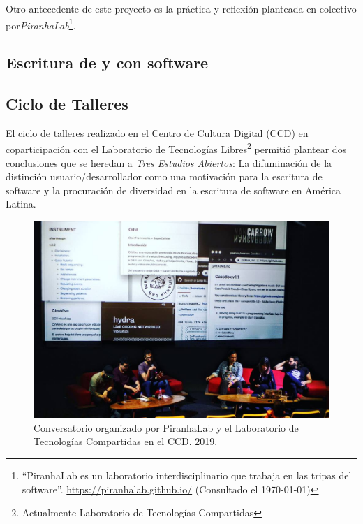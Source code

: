 Otro antecedente de este proyecto es la práctica y reflexión planteada en colectivo por\textit{PiranhaLab}\footnote{``PiranhaLab es un laboratorio interdisciplinario que trabaja en las tripas del software''. \url{https://piranhalab.github.io/} (Consultado el \today)}.

\subsection{Escritura de y con software}

\subsection{Ciclo de Talleres}

El ciclo de talleres realizado en el Centro de Cultura Digital (CCD) en coparticipación con el Laboratorio de Tecnologías Libres\footnote{Actualmente Laboratorio de Tecnologías Compartidas} permitió plantear dos conclusiones que se heredan a \textit{Tres Estudios Abiertos}: La difuminación de la distinción usuario/desarrollador como una motivación para la escritura de software y la procuración de diversidad en la escritura de software en América Latina.

\begin{figure}[tb]
\centering 
\includegraphics[width=\columnwidth]{../img/conversatorio.jpg} 
\caption[Conversatorio CCD]{Conversatorio organizado por PiranhaLab y el Laboratorio de Tecnologías Compartidas en el CCD. 2019.} %
\label{fig:gallery} 
\end{figure}

